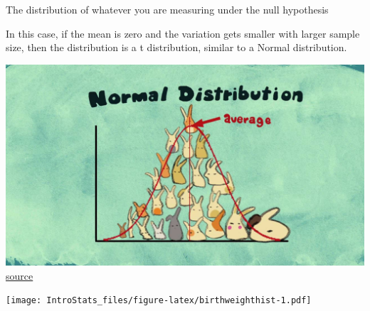 \documentclass[]{article}
\begin{document}
The distribution of whatever you are measuring under the null hypothesis

In this case, if the mean is zero and the variation gets smaller with
larger sample size, then the distribution is a t distribution, similar
to a Normal distribution.

\includegraphics{images/distributions.jpeg}
\href{https://vimeo.com/75089338}{source}

\texttt{[image: IntroStats\_files/figure-latex/birthweighthist-1.pdf]}
\end{document}
